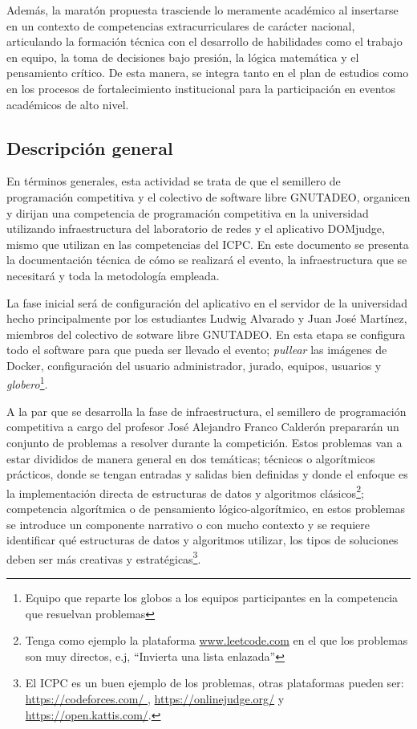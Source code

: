 \documentclass{article}
\begin{document}
Además, la maratón propuesta trasciende lo meramente académico al insertarse en un contexto de competencias extracurriculares de carácter nacional, articulando la formación técnica con el desarrollo de habilidades como el trabajo en equipo, la toma de decisiones bajo presión, la lógica matemática y el pensamiento crítico. De esta manera, se integra tanto en el plan de estudios como en los procesos de fortalecimiento institucional para la participación en eventos académicos de alto nivel.


\subsection{Descripción general}

En términos generales, esta actividad se trata de que el semillero de programación competitiva y el colectivo de software libre GNUTADEO, organicen y dirijan una competencia de programación competitiva en la universidad utilizando infraestructura del laboratorio de redes y el aplicativo DOMjudge\cite{domjudge-docs}, mismo que utilizan en las competencias del ICPC\cite{domjudge-about}. En este documento se presenta la documentación técnica de cómo se realizará el evento, la infraestructura que se necesitará y toda la metodología empleada.


La fase inicial será de configuración del aplicativo en el servidor de la universidad hecho principalmente por los estudiantes Ludwig Alvarado y Juan José Martínez, miembros del colectivo de sotware libre GNUTADEO. En esta etapa se configura todo el software para que pueda ser llevado el evento; \textit{pullear} las imágenes de Docker\cite{domjudge-judgehost,domjudge-domserver,debian_docker}, configuración del usuario administrador, jurado, equipos, usuarios y \textit{globero}\footnote{Equipo que reparte los globos a los equipos participantes en la competencia que resuelvan problemas}.


A la par que se desarrolla la fase de infraestructura, el semillero de programación competitiva a cargo del profesor José Alejandro Franco Calderón prepararán un conjunto de problemas a resolver durante la competición. Estos problemas van a estar divididos de manera general en dos temáticas; técnicos o algorítmicos prácticos, donde se tengan entradas y salidas bien definidas y donde el enfoque es la implementación directa de estructuras de datos y algoritmos clásicos\footnote{Tenga como ejemplo la plataforma \url{www.leetcode.com}\cite{leetcode} en el que los problemas son muy directos, e.j, ``Invierta una lista enlazada''}; competencia algorítmica o de pensamiento lógico-algorítmico, en estos problemas se introduce un componente narrativo o con mucho contexto y se requiere identificar qué estructuras de datos y algoritmos utilizar, los tipos de soluciones deben ser más creativas y estratégicas\footnote{El ICPC es un buen ejemplo de los problemas, otras plataformas pueden ser: \url{ https://codeforces.com/ }, \url{https://onlinejudge.org/} y \url{https://open.kattis.com/}. }.
\end{document}

